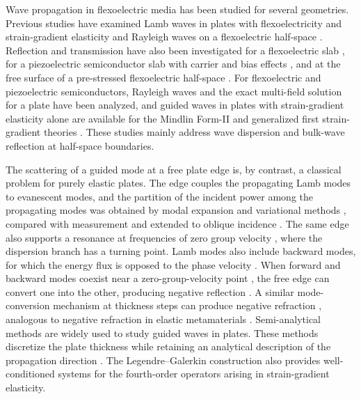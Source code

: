 Wave propagation in flexoelectric media has been studied for several geometries.  Previous studies have examined Lamb waves in plates with flexoelectricity and strain-gradient elasticity \cite{yang2018lamb} and Rayleigh waves on a flexoelectric half-space \cite{yang2020rayleigh}.  Reflection and transmission have also been investigated for a flexoelectric slab \cite{jiao2018slab}, for a piezoelectric semiconductor slab with carrier and bias effects \cite{jiao2019semiconductor}, and at the free surface of a pre-stressed flexoelectric half-space \cite{mondal2022scattering}.  For flexoelectric and piezoelectric semiconductors, Rayleigh waves \cite{biswas2025rayleigh,gupta2025psvoid} and the exact multi-field solution for a plate \cite{zhang2025pscplate} have been analyzed, and guided waves in plates with strain-gradient elasticity alone are available for the Mindlin Form-II and generalized first strain-gradient theories \cite{vavva2009gradient,sidhardh2019microplate}.  These studies mainly address wave dispersion and bulk-wave reflection at half-space boundaries.

The scattering of a guided mode at a free plate edge is, by contrast, a classical problem for purely elastic plates.  The edge couples the propagating Lamb modes to evanescent modes, and the partition of the incident power among the propagating modes was obtained by modal expansion and variational methods \cite{torvik1967reflection,auld1977variational,gregory1983reflection}, compared with measurement \cite{morvan2003lamb} and extended to oblique incidence \cite{santhanam2013reflection}.  The same edge also supports a resonance at frequencies of zero group velocity \cite{prada2005laser}, where the dispersion branch has a turning point.  Lamb modes also include backward modes, for which the energy flux is opposed to the phase velocity \cite{meitzler1965backward}.  When forward and backward modes coexist near a zero-group-velocity point \cite{prada2008local}, the free edge can convert one into the other, producing negative reflection \cite{germano2012anomalous,gerardin2016negative,veres2016broad}.  A similar mode-conversion mechanism at thickness steps can produce negative refraction \cite{bramhavar2011negative}, analogous to negative refraction in elastic metamaterials \cite{zhu2014negative}.  Semi-analytical methods are widely used to study guided waves in plates.  These methods discretize the plate thickness while retaining an analytical description of the propagation direction \cite{adamou2004spectral,bartoli2006modeling}.  The Legendre--Galerkin construction \cite{shen1994efficient} also provides well-conditioned systems for the fourth-order operators arising in strain-gradient elasticity.

